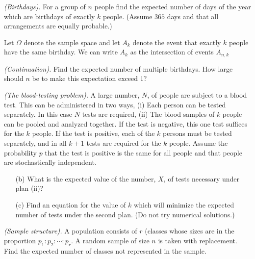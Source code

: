 \begin{problem}[Handout 6, \# 10]
  \emph{(Birthdays).} For a group of \(n\) people find the expected number
  of days of the year which are birthdays of exactly \(k\) people. (Assume
  \(365\) days and that all arrangements are equally probable.)
\end{problem}
\begin{solution}
  Let \(\Omega\) denote the sample space and let \(A_k\) denote the event
  that exactly \(k\) people have the same birthday. We can write \(A_k\) as
  the intersection of events \(A_{n,k}\)
\end{solution}
\newpage

\begin{problem}[Handout 6, \# 11]
  \emph{(Continuation).} Find the expected number of multiple
  birthdays. How large should \(n\) be to make this expectation exceed
  \(1\)?
\end{problem}
\begin{solution}

\end{solution}
\newpage

\begin{problem}[Handout 6, \# 12]
  \emph{(The blood-testing problem).} A large number, \(N\), of people are
  subject to a blood test. This can be administered in two ways, (i) Each
  person can be tested separately. In this case \(N\) tests are required,
  (ii) The blood samples of \(k\) people can be pooled and analyzed
  together. If the test is negative, this one test suffices for the \(k\)
  people. If the test is positive, each of the \(k\) persons must be tested
  separately, and in all \(k+1\) tests are required for the \(k\)
  people. Assume the probability \(p\) that the test is positive is the
  same for all people and that people are stochastically independent.
  \begin{itemize}[noitemsep]
  \item[(b)] What is the expected value of the number, \(X\), of tests
    necessary under plan (ii)?
  \item[(c)] Find an equation for the value of \(k\) which will minimize
    the expected number of tests under the second plan. (Do not try
    numerical solutions.)
  \end{itemize}
  \end{problem}
\begin{solution}

\end{solution}
\newpage

\begin{problem}[Handout 6, \# 13]
  \emph{(Sample structure).} A population consists of \(r\) (classes whose
  sizes are in the proportion \(p_1:p_2:\dotsb:p_r\). A random sample of
  size \(n\) is taken with replacement. Find the expected number of classes
  not represented in the sample.
\end{problem}
\begin{solution}

\end{solution}

